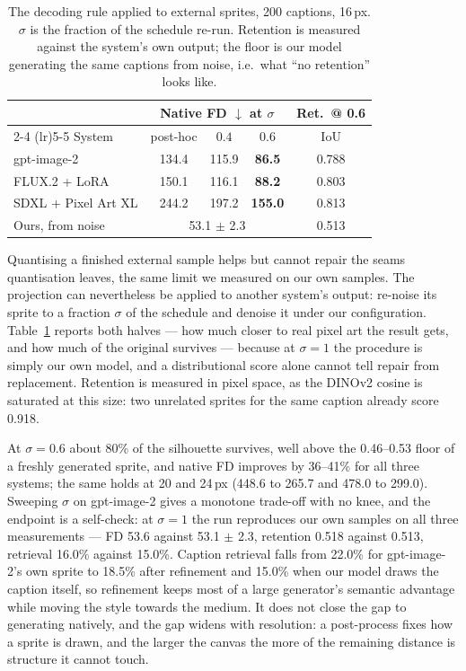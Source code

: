 \documentclass[10pt,twocolumn,letterpaper]{article}
\begin{document}
\begin{table}[t]
\caption{The decoding rule applied to external sprites, 200 captions, 16\,px. $\sigma$ is the fraction of the schedule
re-run. Retention is measured against the system's own output; the floor is our model generating the same captions
from noise, i.e.~what ``no retention'' looks like.}
\label{tab:refine}
\centering
\small
\begin{tabular}{@{}lcccc@{}}
\toprule
& \multicolumn{3}{c}{Native FD $\downarrow$ at $\sigma$} & Ret.\ @ 0.6 \\
\cmidrule(lr){2-4} \cmidrule(lr){5-5}
System & post-hoc & $0.4$ & $0.6$ & IoU \\
\midrule
gpt-image-2         & 134.4 & 115.9 & \textbf{86.5}  & 0.788 \\
FLUX.2 + LoRA       & 150.1 & 116.1 & \textbf{88.2}  & 0.803 \\
SDXL + Pixel Art XL & 244.2 & 197.2 & \textbf{155.0} & 0.813 \\
\midrule
Ours, from noise    & \multicolumn{3}{c}{53.1 $\pm$ 2.3} & 0.513 \\
\bottomrule
\end{tabular}
\end{table}

Quantising a finished external sample helps but cannot repair the seams quantisation leaves, the same limit we measured
on our own samples. The projection can nevertheless be applied to another system's output: re-noise its sprite to a
fraction $\sigma$ of the schedule and denoise it under our configuration. Table~\ref{tab:refine} reports both halves ---
how much closer to real pixel art the result gets, and how much of the original survives --- because at $\sigma{=}1$
the procedure is simply our own model, and a distributional score alone cannot tell repair from replacement. Retention
is measured in pixel space, as the DINOv2 cosine is saturated at this size: two unrelated sprites for the same caption
already score 0.918.

At $\sigma{=}0.6$ about 80\% of the silhouette survives, well above the 0.46--0.53 floor of a freshly generated sprite,
and native FD improves by 36--41\% for all three systems; the same holds at 20 and 24\,px (448.6 to 265.7 and 478.0 to
299.0). Sweeping $\sigma$ on gpt-image-2 gives a monotone trade-off with no knee, and the endpoint is a self-check: at
$\sigma{=}1$ the run reproduces our own samples on all three measurements --- FD 53.6 against 53.1 $\pm$ 2.3,
retention 0.518 against 0.513, retrieval 16.0\% against 15.0\%. Caption retrieval falls from 22.0\% for gpt-image-2's own sprite to
18.5\% after refinement and 15.0\% when our model draws the caption itself, so refinement keeps most of a large
generator's semantic advantage while moving the style towards the medium. It does not close the gap to generating
natively, and the gap widens with resolution: a post-process fixes how a sprite is drawn, and the larger the canvas the
more of the remaining distance is structure it cannot touch.
\end{document}
